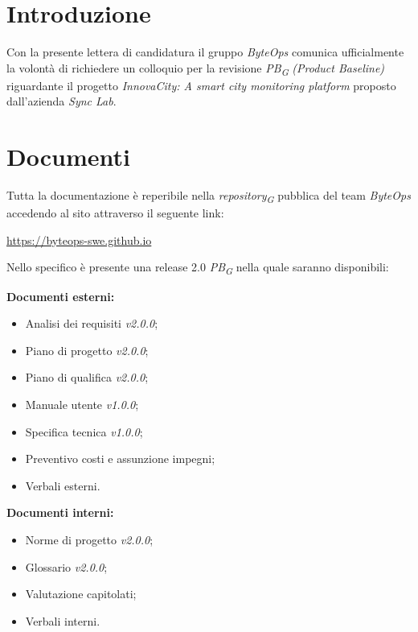 \documentclass{article}
\begin{document}
\flushleft

\section{Introduzione}
Con la presente lettera di candidatura il gruppo \textit{ByteOps} comunica ufficialmente la volontà di richiedere un colloquio per la revisione \textit{PB}\textsubscript{\textit{G}} \textit{(Product Baseline)} riguardante il progetto \textit{InnovaCity: A smart city monitoring platform} proposto dall'azienda \textit{Sync Lab}.

\section{Documenti}
Tutta la documentazione è reperibile nella \textit{repository}\textsubscript{\textit{G}} pubblica del team \textit{ByteOps} accedendo al sito attraverso il seguente link:

\begin{center}
    \href{https://byteops-swe.github.io}{https://byteops-swe.github.io}
\end{center}

Nello specifico è presente una release 2.0 \textit{PB}\textsubscript{\textit{G}} nella quale saranno disponibili:
\vspace{0.2cm}

\textbf{Documenti esterni:}
\begin{itemize}
    \item Analisi dei requisiti \textit{v2.0.0};
    \item Piano di progetto \textit{v2.0.0};
    \item Piano di qualifica \textit{v2.0.0};
    \item Manuale utente \textit{v1.0.0};
    \item Specifica tecnica \textit{v1.0.0};
    \item Preventivo costi e assunzione impegni;
    \item Verbali esterni.
\end{itemize}
\vspace{0.2cm}

\textbf{Documenti interni:}
\begin{itemize}
    \item Norme di progetto \textit{v2.0.0};
    \item Glossario \textit{v2.0.0};
    \item Valutazione capitolati;
    \item Verbali interni.
\end{itemize}
\end{document}
